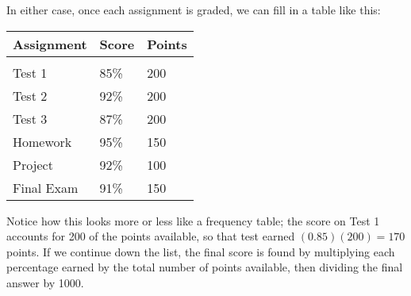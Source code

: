 In either case, once each assignment is graded, we can fill in a table like this:
\begin{center}
\begin{tabular}{l l l}
\textbf{Assignment} & \textbf{Score} & \textbf{Points}\\
\hline
& \\
Test 1 & 85\% & 200\\
Test 2 & 92\% & 200\\
Test 3 & 87\% & 200\\
Homework & 95\% & 150\\
Project & 92\% & 100\\
Final Exam & 91\% & 150
\end{tabular}
\end{center}

Notice how this looks more or less like a frequency table; the score on Test 1 accounts for 200 of the points available, so that test earned $(0.85)(200) = 170$ points.  If we continue down the list, the final score is found by multiplying each percentage earned by the total number of points available, then dividing the final answer by 1000.


